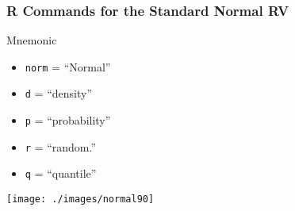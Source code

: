 \begin{frame}
  \frametitle{R Commands for the Standard Normal RV}

\begin{table}
\centering
{}
\end{table}

\begin{block}{Mnemonic}
  \begin{itemize}
    \item \texttt{norm} = ``Normal'' 
    \item \texttt{d} = ``density''
    \item \texttt{p} = ``probability'' 
    \item \texttt{r} = ``random.''
    \item \alert{\texttt{q} = ``quantile''}
  \end{itemize}
\end{block}

\end{frame}
\begin{frame}[t]
  \vspace{-3em}
\begin{center}
\texttt{[image: ./images/normal90]}
\end{center}

\end{frame}
